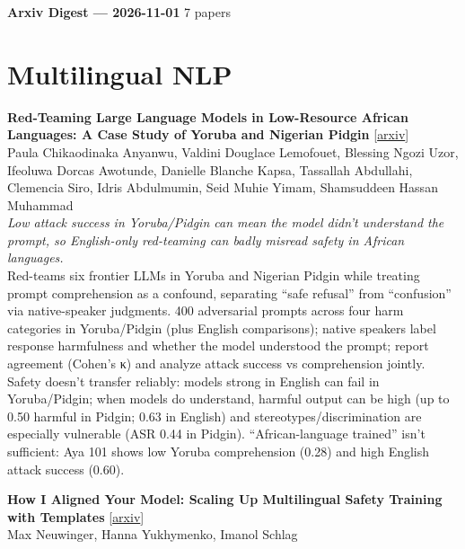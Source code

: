 \documentclass[12pt,letterpaper]{article}
\begin{document}
{\footnotesize\textbf{Arxiv Digest --- 2026-11-01} \hfill 7 papers}

\smallskip

\section*{Multilingual NLP}

{\small\textbf{Red-Teaming Large Language Models in Low-Resource African Languages: A Case Study of Yoruba and Nigerian Pidgin}} {\scriptsize[\href{https://arxiv.org/abs/2610.39590}{arxiv}]}\\
{\scriptsize Paula Chikaodinaka Anyanwu, Valdini Douglace Lemofouet, Blessing Ngozi Uzor, Ifeoluwa Dorcas Awotunde, Danielle Blanche Kapsa, Tassallah Abdullahi, Clemencia Siro, Idris Abdulmumin, Seid Muhie Yimam, Shamsuddeen Hassan Muhammad}\\

{\small\textit{Low attack success in Yoruba/Pidgin can mean the model didn't understand the prompt, so English-only red-teaming can badly misread safety in African languages.}}\\[1pt]
{\footnotesize Red-teams six frontier LLMs in Yoruba and Nigerian Pidgin while treating prompt comprehension as a confound, separating ``safe refusal'' from ``confusion'' via native-speaker judgments. 400 adversarial prompts across four harm categories in Yoruba/Pidgin (plus English comparisons); native speakers label response harmfulness and whether the model understood the prompt; report agreement (Cohen's κ) and analyze attack success vs comprehension jointly. Safety doesn't transfer reliably: models strong in English can fail in Yoruba/Pidgin; when models do understand, harmful output can be high (up to 0.50 harmful in Pidgin; 0.63 in English) and stereotypes/discrimination are especially vulnerable (ASR 0.44 in Pidgin). ``African-language trained'' isn't sufficient: Aya 101 shows low Yoruba comprehension (0.28) and high English attack success (0.60).}

\medskip

{\small\textbf{How I Aligned Your Model: Scaling Up Multilingual Safety Training with Templates}} {\scriptsize[\href{https://arxiv.org/abs/2610.40516}{arxiv}]}\\
{\scriptsize Max Neuwinger, Hanna Yukhymenko, Imanol Schlag}\\
\end{document}

